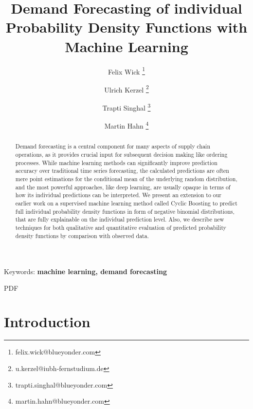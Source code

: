 \documentclass[BCOR=1mm, DIV=calc,10pt,
twoside=true,
twocolumn,
headings=normal]{scrartcl}
\begin{document}
\title{Demand Forecasting of individual Probability Density Functions with Machine Learning}

\author[1]{Felix Wick \thanks{felix.wick@blueyonder.com}}
\author[2]{Ulrich Kerzel \thanks{u.kerzel@iubh-fernstudium.de}}
\author[1]{Trapti Singhal \thanks{trapti.singhal@blueyonder.com}}
\author[1]{Martin Hahn \thanks{martin.hahn@blueyonder.com}}


\date{}

\maketitle

\begin{abstract}
Demand forecasting is a central component for many aspects of supply chain operations, as it provides crucial input for subsequent decision making like ordering processes. While machine learning methods can significantly improve prediction accuracy over traditional time series forecasting, the calculated predictions are often mere point estimations for the conditional mean of the underlying random distribution, and the most powerful approaches, like deep learning, are usually opaque in terms of how its individual predictions can be interpreted. We present an extension to our earlier work on a supervised machine learning method called Cyclic Boosting to predict full individual probability density functions in form of negative binomial distributions, that are fully explainable on the individual prediction level. Also, we describe new techniques for both qualitative and quantitative evaluation of predicted probability density functions by comparison with observed data.
\end{abstract}

{Keywords: \textbf{machine learning, demand forecasting}}

PDF
\section{Introduction}
\end{document}
